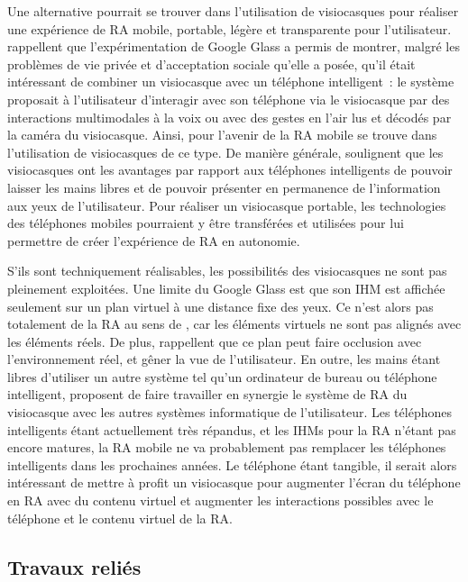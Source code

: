 Une alternative pourrait se trouver dans l'utilisation de visiocasques pour réaliser une expérience de RA mobile, portable, légère et transparente pour l'utilisateur. \citet{KoelleKranzMoeller2015} rappellent que l'expérimentation de Google Glass a permis de montrer, malgré les problèmes de vie privée et d'acceptation sociale qu'elle a posée, qu'il était intéressant de combiner un visiocasque avec un téléphone intelligent~: le système proposait à l'utilisateur d'interagir avec son téléphone via le visiocasque par des interactions multimodales à la voix ou avec des gestes en l'air lus et décodés par la caméra du visiocasque. Ainsi, pour \citet{HuangHuiPeyloEtAl2013} l'avenir de la RA mobile se trouve dans l'utilisation de visiocasques de ce type. De manière générale, \citet{SerranoEnsYangEtAl2015} soulignent que les visiocasques ont les avantages par rapport aux téléphones intelligents de pouvoir laisser les mains libres et de pouvoir présenter en permanence de l'information aux yeux de l'utilisateur. Pour réaliser un visiocasque portable, les technologies des téléphones mobiles pourraient y être transférées et utilisées pour lui permettre de créer l'expérience de RA en autonomie.

S'ils sont techniquement réalisables, les possibilités des visiocasques ne sont pas pleinement exploitées. Une limite du Google Glass est que son IHM est affichée seulement sur un plan virtuel à une distance fixe des yeux. Ce n'est alors pas totalement de la RA au sens de \citet{AzumaBaillotBehringerEtAl2001}, car les éléments virtuels ne sont pas alignés avec les éléments réels. De plus, \citet{SerranoEnsYangEtAl2015} rappellent que ce plan peut faire occlusion avec l'environnement réel, et gêner la vue de l'utilisateur. En outre, les mains étant libres d'utiliser un autre système tel qu'un ordinateur de bureau ou téléphone intelligent, \citet{SerranoEnsYangEtAl2015b} proposent de faire travailler en synergie le système de RA du visiocasque avec les autres systèmes informatique de l'utilisateur. Les téléphones intelligents étant actuellement très répandus, et les IHMs pour la RA n'étant pas encore matures, la RA mobile ne va probablement pas remplacer les téléphones intelligents dans les prochaines années. Le téléphone étant tangible, il serait alors intéressant de mettre à profit un visiocasque pour augmenter l'écran du téléphone en RA avec du contenu virtuel et augmenter les interactions possibles avec le téléphone et le contenu virtuel de la RA.


\subsection*{Travaux reliés}
